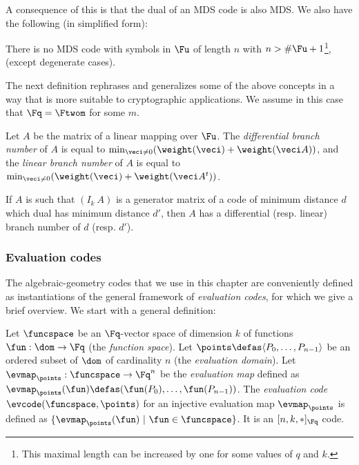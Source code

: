 A consequence of this is that the dual of an MDS code is also MDS.
We also have the following (in simplified form):

\begin{conj}
There is no MDS code with symbols in $\Fu$ of length $n$ with $n > \#\Fu + 1$\footnote{This maximal length can be increased by one
for some values of $q$ and $k$.}, (except degenerate cases).
\end{conj}

The next definition rephrases and generalizes some of the above concepts in a way that is more suitable to cryptographic applications.
We assume in this case that $\Fq = \Ftwom$ for some $m$.

\begin{defi}
Let $A$ be the matrix of a linear mapping over $\Fu$.
The \emph{differential branch number} of $A$
is equal to $\min_{\veci \neq 0}(\weight(\veci) + \weight(\veci A))$,
and the \emph{linear branch number} of $A$ is equal to $\min_{\veci \neq 0}(\weight(\veci) + \weight(\veci A^t))$.
\end{defi}

If $A$ is such that $(I_k~A)$ is a generator matrix of a code of minimum distance $d$ which dual has minimum distance $d'$,
then $A$ has a differential (resp. linear) branch number of $d$ (resp. $d'$).

\subsubsection{Evaluation codes}

The algebraic-geometry codes that we use in this chapter are conveniently defined as instantiations of the general framework of \emph{evaluation codes}, for which
we give a brief overview.
We start with a general definition:

\begin{defi}
Let $\funcspace$ be an $\Fq$-vector space of dimension $k$ of functions $\fun : \dom \rightarrow \Fq$ (the \emph{function space}). Let $\points \defas \langle P_0,\ldots, P_{n-1}\rangle$
be an ordered subset of $\dom$ of cardinality $n$ (the \emph{evaluation domain}). Let $\evmap_\points : \funcspace \rightarrow \Fq^n$ be the \emph{evaluation map}
defined as $\evmap_\points(\fun) \defas (\fun(P_0),\ldots,\fun(P_{n-1}))$.
The \emph{evaluation code} $\evcode(\funcspace,\points)$ for an injective evaluation map $\evmap_\points$ is defined as $\{\evmap_\points(\fun)~|~\fun \in \funcspace\}$.
It is an $[n,k,\ast]_{\Fq}$ code.
\end{defi}

